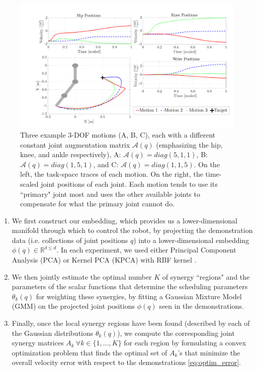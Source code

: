 \documentclass[letterpaper, 10 pt, conference,fleqn]{ieeeconf}
\begin{document}
\begin{figure}[t]
	\centering
	\includegraphics[width=\linewidth]{../Pic/A_comparison_positions.pdf}
	\caption{Three example 3-DOF motions (A, B, C), each with a different constant joint augmentation matrix $\mathcal{A}(q)$ (emphasizing the hip, knee, and ankle respectively), A: $\mathcal{A}(q)=diag(5,1,1) $, B: $\mathcal{A}(q)=diag(1,5,1)$, and C: $\mathcal{A}(q)=diag(1,1,5)$. On the left, the task-space traces of each motion. On the right, the time-scaled joint positions of each joint. Each motion tends to use its ``primary" joint most and uses the other available joints to compensate for what the primary joint cannot do.}
	\label{fig:A_example}
	\vspace{-15pt}
\end{figure}


\begin{enumerate}
\item We first construct our embedding, which provides us a lower-dimensional manifold through which to control the robot, by projecting the demonstration data (i.e. collections of joint positions $q$) into a lower-dimensional embedding $\phi(q)\in \mathbb{R}^{\delta\leq d}$. In each experiment, we used either Principal Component Analysis (PCA) \cite{jolliffe1986pca} or Kernel PCA (KPCA) with RBF kernel \cite{scholkopf1997kernel}.

\item We then jointly estimate the optimal number $K$ of synergy ``regions" and the parameters of the scalar functions that determine the scheduling parameters $\theta_k(q)$ for weighting these synergies, by fitting a Gaussian Mixture Model (GMM) on the projected joint positions $\phi(q)$ seen in the demonstrations.

\item Finally, once the local synergy regions have been found (described by each of the Gaussian distributions $\theta_k(q)$), we compute the corresponding joint synergy matrices $A_k~\forall k\in\{1,\dots,K\}$ for each region by formulating a convex optimization problem that finds the optimal set of $A_k$'s that minimize the overall velocity error with respect to the demonstrations \eqref{eq:optim_error}.
\end{enumerate}
\end{document}

